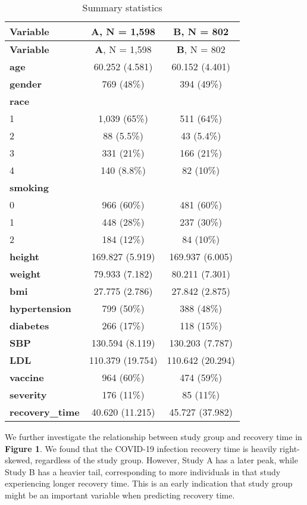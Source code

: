 \documentclass[
]{article}
\begin{document}
\begin{longtable}[]{@{}lcc@{}}
\caption{Summary statistics}\tabularnewline
\toprule\noalign{}
\textbf{Variable} & \textbf{A}, N = 1,598 & \textbf{B}, N = 802 \\
\midrule\noalign{}
\endfirsthead
\toprule\noalign{}
\textbf{Variable} & \textbf{A}, N = 1,598 & \textbf{B}, N = 802 \\
\midrule\noalign{}
\endhead
\bottomrule\noalign{}
\endlastfoot
\textbf{age} & 60.252 (4.581) & 60.152 (4.401) \\
\textbf{gender} & 769 (48\%) & 394 (49\%) \\
\textbf{race} & & \\
1 & 1,039 (65\%) & 511 (64\%) \\
2 & 88 (5.5\%) & 43 (5.4\%) \\
3 & 331 (21\%) & 166 (21\%) \\
4 & 140 (8.8\%) & 82 (10\%) \\
\textbf{smoking} & & \\
0 & 966 (60\%) & 481 (60\%) \\
1 & 448 (28\%) & 237 (30\%) \\
2 & 184 (12\%) & 84 (10\%) \\
\textbf{height} & 169.827 (5.919) & 169.937 (6.005) \\
\textbf{weight} & 79.933 (7.182) & 80.211 (7.301) \\
\textbf{bmi} & 27.775 (2.786) & 27.842 (2.875) \\
\textbf{hypertension} & 799 (50\%) & 388 (48\%) \\
\textbf{diabetes} & 266 (17\%) & 118 (15\%) \\
\textbf{SBP} & 130.594 (8.119) & 130.203 (7.787) \\
\textbf{LDL} & 110.379 (19.754) & 110.642 (20.294) \\
\textbf{vaccine} & 964 (60\%) & 474 (59\%) \\
\textbf{severity} & 176 (11\%) & 85 (11\%) \\
\textbf{recovery\_time} & 40.620 (11.215) & 45.727 (37.982) \\
\end{longtable}

We further investigate the relationship between study group and recovery
time in \textbf{Figure 1}. We found that the COVID-19 infection recovery
time is heavily right-skewed, regardless of the study group. However,
Study A has a later peak, while Study B has a heavier tail,
corresponding to more individuals in that study experiencing longer
recovery time. This is an early indication that study group might be an
important variable when predicting recovery time.
\end{document}
